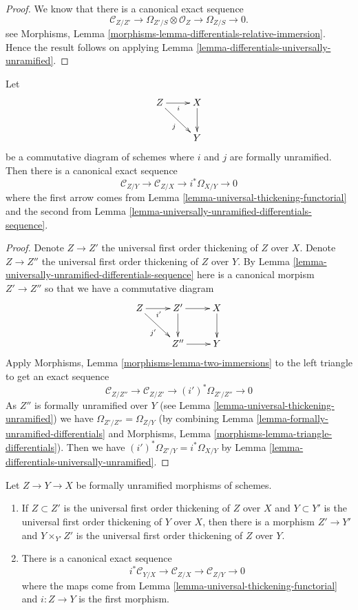 \begin{proof}
We know that there is a canonical exact sequence
$$
\mathcal{C}_{Z/Z'} \to
\Omega_{Z'/S} \otimes \mathcal{O}_Z \to
\Omega_{Z/S} \to 0.
$$
see
Morphisms, Lemma \ref{morphisms-lemma-differentials-relative-immersion}.
Hence the result follows on applying
Lemma \ref{lemma-differentials-universally-unramified}.
\end{proof}

\begin{lemma}
\label{lemma-two-unramified-morphisms}
Let
$$
\xymatrix{
Z \ar[r]_i \ar[rd]_j & X \ar[d] \\
& Y
}
$$
be a commutative diagram of schemes where $i$ and $j$ are formally
unramified. Then there is a canonical exact sequence
$$
\mathcal{C}_{Z/Y} \to
\mathcal{C}_{Z/X} \to
i^*\Omega_{X/Y} \to 0
$$
where the first arrow comes from
Lemma \ref{lemma-universal-thickening-functorial}
and the second from
Lemma \ref{lemma-universally-unramified-differentials-sequence}.
\end{lemma}

\begin{proof}
Denote $Z \to Z'$ the universal first order thickening of $Z$ over $X$.
Denote $Z \to Z''$ the universal first order thickening of $Z$ over $Y$.
By
Lemma \ref{lemma-universally-unramified-differentials-sequence}
here is a canonical morpism $Z' \to Z''$ so that we have a commutative
diagram
$$
\xymatrix{
Z \ar[r]_{i'} \ar[rd]_{j'} & Z' \ar[r] \ar[d] & X \ar[d] \\
& Z'' \ar[r] & Y
}
$$
Apply
Morphisms, Lemma \ref{morphisms-lemma-two-immersions}
to the left triangle to get an exact sequence
$$
\mathcal{C}_{Z/Z''} \to
\mathcal{C}_{Z/Z'} \to
(i')^*\Omega_{Z'/Z''} \to 0
$$
As $Z''$ is formally unramified over $Y$ (see
Lemma \ref{lemma-universal-thickening-unramified})
we have
$\Omega_{Z'/Z''} = \Omega_{Z/Y}$ (by combining
Lemma \ref{lemma-formally-unramified-differentials}
and
Morphisms, Lemma \ref{morphisms-lemma-triangle-differentials}).
Then we have $(i')^*\Omega_{Z'/Y} = i^*\Omega_{X/Y}$ by
Lemma \ref{lemma-differentials-universally-unramified}.
\end{proof}

\begin{lemma}
\label{lemma-transitivity-conormal}
Let $Z \to Y \to X$ be formally unramified morphisms of schemes.
\begin{enumerate}
\item If $Z \subset Z'$ is the universal first order thickening of $Z$
over $X$ and $Y \subset Y'$ is the universal first order thickening of $Y$
over $X$, then there is a morphism $Z' \to Y'$ and $Y \times_{Y'} Z'$ is
the universal first order thickening of $Z$ over $Y$.
\item There is a canonical exact sequence
$$
i^*\mathcal{C}_{Y/X} \to
\mathcal{C}_{Z/X} \to
\mathcal{C}_{Z/Y} \to 0
$$
where the maps come from
Lemma \ref{lemma-universal-thickening-functorial}
and $i : Z \to Y$ is the first morphism.
\end{enumerate}
\end{lemma}

